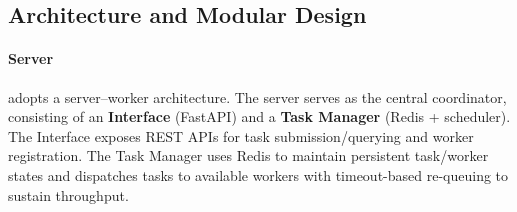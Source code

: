 



\subsection{Architecture and Modular Design}
\paragraph{Server} \env{} adopts a server--worker architecture. The server serves as the central coordinator, consisting of an \textbf{Interface} (FastAPI) and a \textbf{Task Manager} (Redis + scheduler). The Interface exposes REST APIs for task submission/querying and worker registration. The Task Manager uses Redis to maintain persistent task/worker states and dispatches tasks to available workers with timeout-based re-queuing to sustain throughput.

